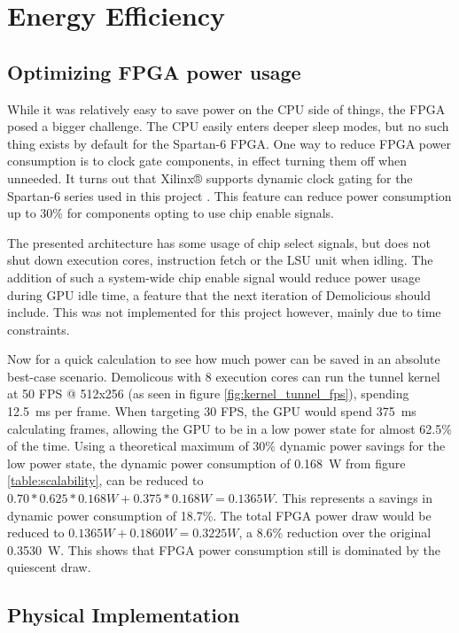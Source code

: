 \documentclass[../main/report.tex]{subfiles}
\begin{document}
\section{Energy Efficiency}

\subsection{Optimizing FPGA power usage}

While it was relatively easy to save power on the CPU side of things, the FPGA posed a bigger challenge.
The CPU easily enters deeper sleep modes, but no such thing exists by default for the Spartan-6 FPGA.
One way to reduce FPGA power consumption is to clock gate components, in effect turning them off when unneeded.
It turns out that Xilinx® supports dynamic clock gating for the Spartan-6 series used in this project \cite{xilinx-clock-gating}.
This feature can reduce power consumption up to 30\% for components opting to use chip enable signals.

The presented architecture has some usage of chip select signals, but does not shut down execution cores, instruction fetch or the LSU unit when idling.
The addition of such a system-wide chip enable signal would reduce power usage during GPU idle time, a feature that the next iteration of Demolicious should include.
This was not implemented for this project however, mainly due to time constraints.

Now for a quick calculation to see how much power can be saved in an absolute best-case scenario.
Demolicous with 8 execution cores can run the tunnel kernel at 50 FPS @ 512x256 (as seen in figure \ref{fig:kernel_tunnel_fps}), spending \SI{12.5}{ms} per frame.
When targeting 30 FPS, the GPU would spend \SI{375}{ms} calculating frames, allowing the GPU to be in a low power state for almost 62.5\% of the time.
Using a theoretical maximum of 30\% dynamic power savings for the low power state, the dynamic power consumption of \SI{0.168}{W} from figure \ref{table:scalability}, can be reduced to $ 0.70 * 0.625 * 0.168 W + 0.375 * 0.168 W = 0.1365 W$.
This represents a savings in dynamic power consumption of 18.7\%.
The total FPGA power draw would be reduced to $ 0.1365 W + 0.1860 W = 0.3225 W$, a 8.6\% reduction over the original \SI{0.3530}{W}.
This shows that FPGA power consumption still is dominated by the quiescent draw.

\subsection{Physical Implementation}
\end{document}
